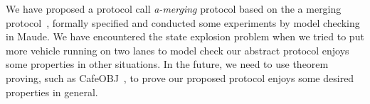 \documentclass[10pt, conference, compsocconf]{IEEEtran}
\begin{document}
We have proposed a protocol call \textit{a-merging} protocol based on the a merging protocol~\cite{10.1145/3055004.3055028}, formally specified and conducted some experiments by model checking in Maude.
We have encountered the state explosion problem when we tried to put more vehicle running on two lanes to model check our abstract protocol enjoys some properties in other situations.
In the future, we need to use theorem proving, such as CafeOBJ~\cite{DiaconescuF98}, to prove our proposed protocol enjoys some desired properties in general.



%
%



%
%
\end{document}
